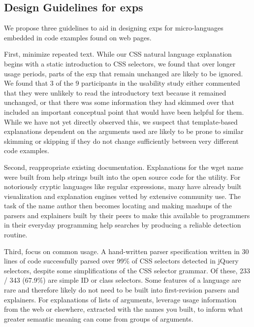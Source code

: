 \begin{changes}
\subsection{Design Guidelines for \Glspl{exp}}
We propose three guidelines to aid in designing \glspl{exp} for micro-languages embedded in code examples found on web pages.

First, minimize repeated text.
While our CSS natural language explanation begins with a static introduction to CSS selectors, we found that over longer usage periods, parts of the \gls{exp} that remain unchanged are likely to be ignored.
We found that 3 of the 9 participants in the usability study either commented that they were unlikely to read the introductory text because it remained unchanged, or that there was some information they had skimmed over that included an important conceptual point that would have been helpful for them.
While we have not yet directly observed this, we suspect that template-based explanations dependent on the arguments used are likely to be prone to similar skimming or skipping if they do not change sufficiently between very different code examples.

Second, reappropriate existing documentation.
Explanations for the wget \gls{name} were built from help strings built into the open source code for the utility.
For notoriously cryptic languages like regular expressions, many have already built visualization and explanation engines vetted by extensive community use.
The task of the \gls{name} author then becomes locating and making mashups of the parsers and explainers built by their peers to make this available to programmers in their everyday programming help searches by producing a reliable detection routine.

Third, focus on common usage.
A hand-written parser specification written in 30 lines of code successfully parsed over 99\% of CSS selectors detected in jQuery selectors, despite some simplifications of the CSS selector grammar.
Of these, 233 / 343 (67.9\%) are simple ID or class selectors.
Some features of a language are rare and therefore likely do not need to be built into first-revision parsers and explainers.
For explanations of lists of arguments, leverage usage information from the web or elsewhere, extracted with the \glspl{name} you built, to inform what greater semantic meaning can come from groups of arguments.

\end{changes}
